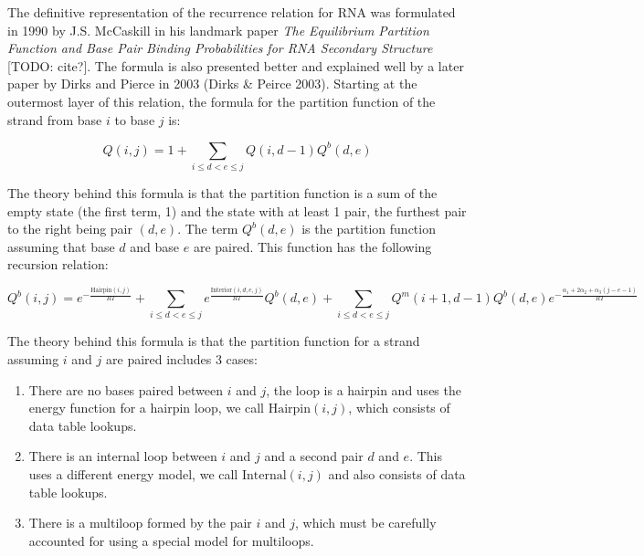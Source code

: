 The definitive representation of the recurrence relation for RNA was
formulated in 1990 by J.S. McCaskill in his landmark paper \emph{The
Equilibrium Partition Function and Base Pair Binding Probabilities for
RNA Secondary Structure} [TODO: cite?]. The formula is also presented
better and explained well by a later paper by Dirks and Pierce in 2003
(Dirks & Peirce 2003). Starting at the outermost layer of this
relation, the formula for the partition function of the strand from
base $i$ to base $j$ is:

\begin{equation} Q(i,j) = 1 + \sum_{i \leq d < e \leq j}Q(i, d - 1)
Q^b(d, e) \end{equation}

The theory behind this formula is that the partition function is a sum
of the empty state (the first term, 1) and the state with at least 1
pair, the furthest pair to the right being pair $(d,e)$. The term
$Q^b(d,e)$ is the partition function assuming that base $d$ and base
$e$ are paired. This function has the following recursion relation:

\begin{equation} Q^b(i, j) = e^{-\frac{\text{Hairpin}(i,j)}{RT}} +
\sum_{i \leq d < e \leq j} e^{\frac{\text{Interior}(i, d, e,
j)}{RT}}Q^b(d,e) + \sum_{i \leq d < e \leq j} Q^m(i + 1, d - 1)Q^b(d,
e) e^{-\frac{\alpha_1 + 2\alpha_2 + \alpha_3(j-e-1)}{RT}}
\end{equation}

The theory behind this formula is that the partition function for a
strand assuming $i$ and $j$ are paired includes 3 cases:

\begin{enumerate}

\item

There are no bases paired between $i$ and $j$, the loop is a hairpin
and uses the energy function for a hairpin loop, we call
$\text{Hairpin}(i,j)$, which consists of data table lookups.

\item There is an internal loop between $i$ and $j$ and a second pair
$d$ and $e$. This uses a different energy model, we call
$\text{Internal}(i,j)$ and also consists of data table lookups.

\item There is a multiloop formed by the pair $i$ and $j$, which must
be carefully accounted for using a special model for multiloops.

\end{enumerate}

